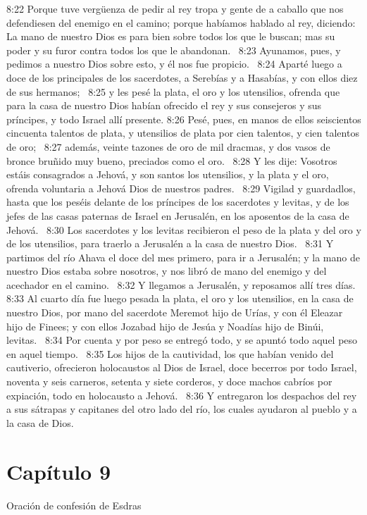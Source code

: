 8:22 Porque tuve vergüenza de pedir al rey tropa y gente de a caballo que nos defendiesen del enemigo en el camino; porque habíamos hablado al rey, diciendo: La mano de nuestro Dios es para bien sobre todos los que le buscan; mas su poder y su furor contra todos los que le abandonan.  
8:23 Ayunamos, pues, y pedimos a nuestro Dios sobre esto, y él nos fue propicio.  
8:24 Aparté luego a doce de los principales de los sacerdotes, a Serebías y a Hasabías, y con ellos diez de sus hermanos;  
8:25 y les pesé la plata, el oro y los utensilios, ofrenda que para la casa de nuestro Dios habían ofrecido el rey y sus consejeros y sus príncipes, y todo Israel allí presente. 
8:26 Pesé, pues, en manos de ellos seiscientos cincuenta talentos de plata, y utensilios de plata por cien talentos, y cien talentos de oro;  
8:27 además, veinte tazones de oro de mil dracmas, y dos vasos de bronce bruñido muy bueno, preciados como el oro.  
8:28 Y les dije: Vosotros estáis consagrados a Jehová, y son santos los utensilios, y la plata y el oro, ofrenda voluntaria a Jehová Dios de nuestros padres.  
8:29 Vigilad y guardadlos, hasta que los peséis delante de los príncipes de los sacerdotes y levitas, y de los jefes de las casas paternas de Israel en Jerusalén, en los aposentos de la casa de Jehová.  
8:30 Los sacerdotes y los levitas recibieron el peso de la plata y del oro y de los utensilios, para traerlo a Jerusalén a la casa de nuestro Dios.  
8:31 Y partimos del río Ahava el doce del mes primero, para ir a Jerusalén; y la mano de nuestro Dios estaba sobre nosotros, y nos libró de mano del enemigo y del acechador en el camino.  
8:32 Y llegamos a Jerusalén, y reposamos allí tres días.  
8:33 Al cuarto día fue luego pesada la plata, el oro y los utensilios, en la casa de nuestro Dios, por mano del sacerdote Meremot hijo de Urías, y con él Eleazar hijo de Finees; y con ellos Jozabad hijo de Jesúa y Noadías hijo de Binúi, levitas.  
8:34 Por cuenta y por peso se entregó todo, y se apuntó todo aquel peso en aquel tiempo.  
8:35 Los hijos de la cautividad, los que habían venido del cautiverio, ofrecieron holocaustos al Dios de Israel, doce becerros por todo Israel, noventa y seis carneros, setenta y siete corderos, y doce machos cabríos por expiación, todo en holocausto a Jehová.  
8:36 Y entregaron los despachos del rey a sus sátrapas y capitanes del otro lado del río, los cuales ayudaron al pueblo y a la casa de Dios.  
\section*{Capítulo 9 }
Oración de confesión de Esdras  

